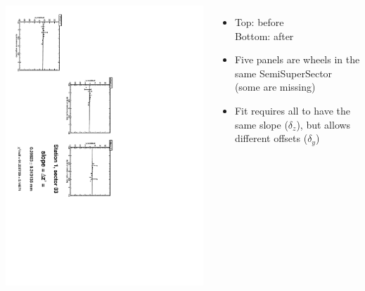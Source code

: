 \documentclass[compress]{beamer}
\begin{document}
\begin{frame}
\begin{columns}
\vfill
\includegraphics[height=\linewidth, angle=90]{zfits_after/zfit_1_03.pdf}
\begin{itemize}
\item Top: before \\ Bottom: after
\item Five panels are wheels in the same SemiSuperSector (some are missing)
\item Fit requires all to have the same slope ($\delta_z$), but allows different offsets ($\delta_y$)
\end{itemize}
\end{columns}
\end{frame}
\end{document}
